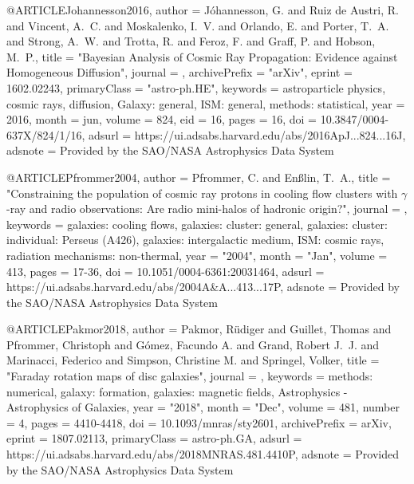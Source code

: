 \documentclass[useAMS,usenatbib]{mnras}
\begin{document}
{@ARTICLE{Johannesson2016,
   author = {{J{\'o}hannesson}, G. and {Ruiz de Austri}, R. and {Vincent}, A.~C. and 
	{Moskalenko}, I.~V. and {Orlando}, E. and {Porter}, T.~A. and 
	{Strong}, A.~W. and {Trotta}, R. and {Feroz}, F. and {Graff}, P. and 
	{Hobson}, M.~P.},
    title = "{Bayesian Analysis of Cosmic Ray Propagation: Evidence against Homogeneous Diffusion}",
  journal = {\apj},
archivePrefix = "arXiv",
   eprint = {1602.02243},
 primaryClass = "astro-ph.HE",
 keywords = {astroparticle physics, cosmic rays, diffusion, Galaxy: general, ISM: general, methods: statistical},
     year = 2016,
    month = jun,
   volume = 824,
      eid = {16},
    pages = {16},
      doi = {10.3847/0004-637X/824/1/16},
   adsurl = {https://ui.adsabs.harvard.edu/abs/2016ApJ...824...16J},
  adsnote = {Provided by the SAO/NASA Astrophysics Data System}
}

@ARTICLE{Pfrommer2004,
       author = {{Pfrommer}, C. and {En{\ss}lin}, T.~A.},
        title = "{Constraining the population of cosmic ray protons in cooling flow clusters with {\ensuremath{\gamma}}-ray and radio observations:  Are radio mini-halos of hadronic origin?}",
      journal = {\aap},
     keywords = {galaxies: cooling flows, galaxies: cluster: general, galaxies: cluster: individual: Perseus (A426), galaxies: intergalactic medium, ISM: cosmic rays, radiation mechanisms: non-thermal},
         year = "2004",
        month = "Jan",
       volume = {413},
        pages = {17-36},
          doi = {10.1051/0004-6361:20031464},
       adsurl = {https://ui.adsabs.harvard.edu/abs/2004A&A...413...17P},
      adsnote = {Provided by the SAO/NASA Astrophysics Data System}
}

@ARTICLE{Pakmor2018,
       author = {{Pakmor}, R{\"u}diger and {Guillet}, Thomas and {Pfrommer}, Christoph and
         {G{\'o}mez}, Facundo A. and {Grand}, Robert J.~J. and
         {Marinacci}, Federico and {Simpson}, Christine M. and
         {Springel}, Volker},
        title = "{Faraday rotation maps of disc galaxies}",
      journal = {\mnras},
     keywords = {methods: numerical, galaxy: formation, galaxies: magnetic fields, Astrophysics - Astrophysics of Galaxies},
         year = "2018",
        month = "Dec",
       volume = {481},
       number = {4},
        pages = {4410-4418},
          doi = {10.1093/mnras/sty2601},
archivePrefix = {arXiv},
       eprint = {1807.02113},
 primaryClass = {astro-ph.GA},
       adsurl = {https://ui.adsabs.harvard.edu/abs/2018MNRAS.481.4410P},
      adsnote = {Provided by the SAO/NASA Astrophysics Data System}
}

}
\end{document}
